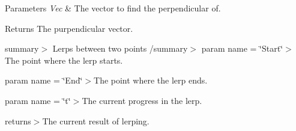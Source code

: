 \begin{DoxyParams}{Parameters}
{\em Vec} & The vector to find the perpendicular of.\\
\hline
\end{DoxyParams}
\begin{DoxyReturn}{Returns}
The purpendicular vector.
\end{DoxyReturn}
summary$>$ Lerps between two points /summary$>$ param name = \char`\"{}\+Start\char`\"{}$>$The point where the lerp starts.

param name = \char`\"{}\+End\char`\"{}$>$The point where the lerp ends.

param name = \char`\"{}t\char`\"{}$>$The current progress in the lerp.

returns$>$The current result of lerping.